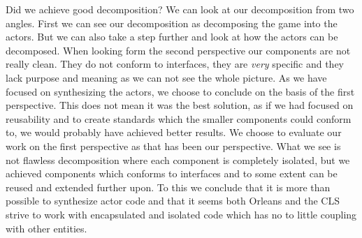 Did we achieve good decomposition? We can look at our decomposition from two angles. First we can see our decomposition as decomposing the game into the actors. But we can also take a step further and look at how the actors can be decomposed. When looking form the second perspective our components are not really clean. They do not conform to interfaces, they are \textit{very} specific and they lack purpose and meaning as we can not see the whole picture. As we have focused on synthesizing the actors, we choose to conclude on the basis of the first perspective. This does not mean it was the best solution, as if we had focused on reusability and to create standards which the smaller components could conform to, we would probably have achieved better results. We choose to evaluate our work on the first perspective as that has been our perspective. What we see is not flawless decomposition where each component is completely isolated, but we achieved components which conforms to interfaces and to some extent can be reused and extended further upon. To this we conclude that it is more than possible to synthesize actor code and that it seems both Orleans and the CLS strive to work with encapsulated and isolated code which has no to little coupling with other entities.